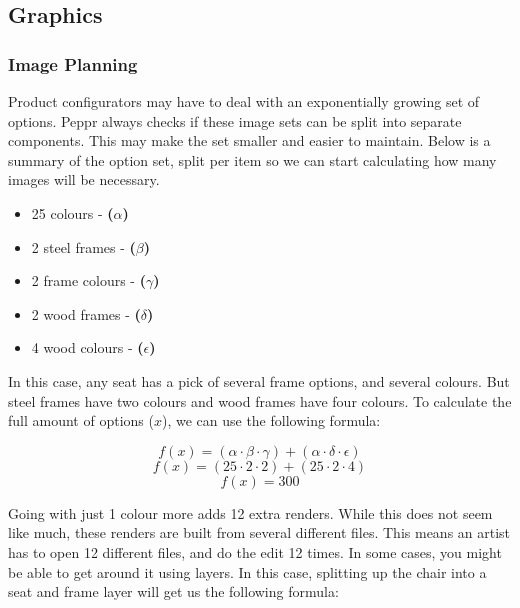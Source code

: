 \subsection{Graphics}

\subsubsection{Image Planning}
Product configurators may have to deal with an exponentially growing set of options. Peppr always checks if these image sets can be split into separate components. This may make the set smaller and easier to maintain. Below is a summary of the option set, split per item so we can start calculating how many images will be necessary.
\begin{itemize}
	\item 25 colours - \textbf{(\( \alpha \))}
	\item 2 steel frames - \textbf{(\( \beta \))}
	\item 2 frame colours - \textbf{(\( \gamma \))}
	\item 2 wood frames - \textbf{(\( \delta \))}
	\item 4 wood colours - \textbf{(\( \epsilon \))}
\end{itemize}

In this case, any seat has a pick of several frame options, and several colours. But steel frames have two colours and wood frames have four colours. To calculate the full amount of options ($x$), we can use the following formula:
 
\[ f(x) = (\alpha \cdot \beta \cdot \gamma) + (\alpha \cdot \delta \cdot \epsilon)\]
\[ f(x) = (25 \cdot 2 \cdot 2) + (25 \cdot 2 \cdot 4)\]
\[ f(x) = 300\]

Going with just 1 colour more adds 12 extra renders. While this does not seem like much, these renders are built from several different files. This means an artist has to open 12 different files, and do the edit 12 times.
In some cases, you might be able to get around it using layers. In this case, splitting up the chair into a seat and frame layer will get us the following formula:

